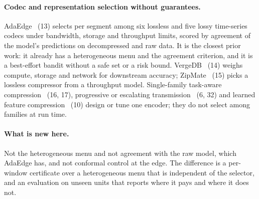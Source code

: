 \paragraph{Codec and representation selection without guarantees.}
AdaEdge~\cite{liu2024adaedge} (13) selects per segment among six lossless and five lossy
time-series codecs under bandwidth, storage and throughput limits, scored by agreement of the
model's predictions on decompressed and raw data. It is the closest prior work: it already has a
heterogeneous menu and the agreement criterion, and it is a best-effort bandit without a safe set
or a risk bound. VergeDB~\cite{paparrizos2021vergedb} (14) weighs compute, storage and network for
downstream accuracy; ZipMate~\cite{lu2020zipmate} (15) picks a lossless compressor from a
throughput model. Single-family task-aware compression~\cite{brosh2021dynamicdeep,huang2020deadline}
(16, 17), progressive or escalating transmission~\cite{amiri2022sicedge,lan2021progressftx} (6, 32)
and learned feature compression~\cite{matsubara2022sc} (10) design or tune one encoder; they do not
select among families at run time.

\paragraph{What is new here.} Not the heterogeneous menu and not agreement with the raw model,
which AdaEdge has, and not conformal control at the edge. The difference is a per-window
certificate over a heterogeneous menu that is independent of the selector, and an evaluation on
unseen units that reports where it pays and where it does not.
